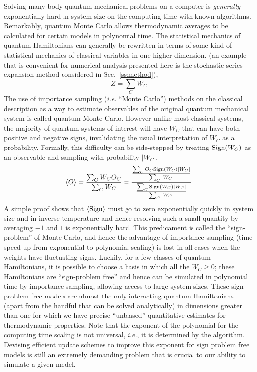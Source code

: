 \documentclass[aps,prb,groupedaddress,twocolumn]{revtex4}
\begin{document}
Solving many-body quantum mechanical problems on a computer is {\em generally}
exponentially hard in system size on the computing time with known
algorithms. Remarkably, quantum Monte Carlo allows thermodynamic
averages to be calculated for certain models
in polynomial time. The statistical mechanics of quantum Hamiltonians can generally be
rewritten in terms of some kind of statistical mechanics of classical
variables in one higher dimension. (an example that is
convenient for numerical analysis presented here is the stochastic series
expansion method considered in Sec.~\ref{ss:method}),
\begin{equation}
\label{eq:wc}
Z=\sum_C W_C
\end{equation}
 The use of importance sampling ({\em i.e.} ``Monte Carlo'')
methods on the classical description as a way to estimate observables of the
original quantum mechanical system is called
quantum Monte Carlo. However unlike most classical systems, the
majority of
quantum systems of interest will have $W_C$ that can have both
positive and negative signs, invalidating the usual interpretation of
$W_C$ as a probability. Formally, this difficulty can be side-stepped
by treating ${\rm  Sign} (W_C)$ as an observable and sampling with
probability $|W_C|$,
\begin{equation}
\langle O \rangle = \frac{\sum_C W_C O_C}{\sum_C W_C} =
\frac{\frac{\sum_C O_C {\rm Sign}(W_C) |W_C|}{\sum_{C}|W_C|}}{\frac{\sum_C
    {\rm Sign}(W_C)|W_C|}{\sum_{C}|W_C|}}
\end{equation}
A simple proof shows that $\langle {\rm Sign}\rangle$ must go to zero
exponentially quickly in system size and in inverse temperature and hence
resolving such a small quantity by averaging $-1$ and $1$ is
exponentially hard. This predicament is called the ``sign-problem'' of
Monte Carlo, and hence the advantage of importance sampling (time speed-up
from exponential to polynomial scaling) is
lost in all cases when the weights have fluctuating signs. Luckily, for a few classes of quantum Hamiltonians, it is possible to
choose a basis in which all the $W_C\geq 0$; these Hamiltonians are
``sign-problem free'' and hence can be simulated in polynomial time by
importance sampling, allowing access to large system sizes. 
These sign problem free models are almost the only interacting quantum
Hamiltonians (apart from the handful that can be solved analytically) in dimensions greater than one for which we have precise ``unbiased''
quantitative estimates for
thermodynamic properties.  
 Note that the exponent of the polynomial for the computing time
 scaling is not universal, {\em i.e.}, it is
determined by the algorithm. Devising efficient update schemes to
improve this exponent for
sign problem free models
is still an extremely demanding problem that is crucial to our ability to
simulate a given model. 
\end{document}
